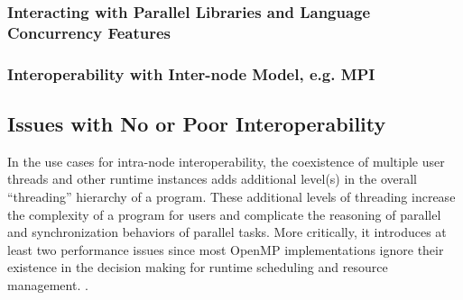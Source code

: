 %

\subsubsection{Interacting with Parallel Libraries and Language Concurrency Features}



\subsubsection{Interoperability with Inter-node Model, e.g. MPI}




\subsection{Issues with No or Poor Interoperability}
In the use cases for intra-node interoperability, 
the coexistence of multiple user threads and other runtime instances
adds additional level(s) in the overall ``threading''
hierarchy of a program. %
These additional levels of threading increase the complexity of a program for 
users and complicate the reasoning of parallel and synchronization behaviors of parallel tasks. 
More critically, it introduces at least two performance issues
since most OpenMP implementations ignore their existence %
in the decision making for runtime scheduling and resource management. 
. %

